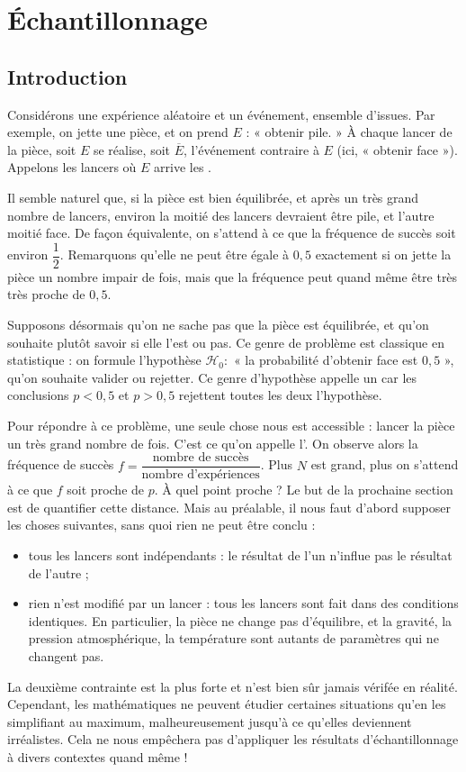 
\chapter{Échantillonnage}

\section{Introduction}

Considérons une expérience aléatoire et un événement, ensemble d'issues.
Par exemple, on jette une pièce, et on prend $E$ : « obtenir pile. »
À chaque lancer de la pièce, soit $E$ se réalise, soit $\overline{E}$, l'événement contraire à $E$ (ici, « obtenir face »).
Appelons les lancers où $E$ arrive les .

Il semble naturel que, si la pièce est bien équilibrée, et après un très grand nombre de lancers, environ la moitié des lancers devraient être pile, et l'autre moitié face.
De façon équivalente, on s'attend à ce que la fréquence de succès soit environ $\dfrac12$.
Remarquons qu'elle ne peut être égale à $0,5$ exactement si on jette la pièce un nombre impair de fois, mais que la fréquence peut quand même être très très proche de $0,5$.

Supposons désormais qu'on ne sache pas que la pièce est équilibrée, et qu'on souhaite plutôt savoir si elle l'est ou pas.
Ce genre de problème est classique en statistique : on formule l'hypothèse $\mathcal{H}_0 :$ « la probabilité d'obtenir face est $0,5$ », qu'on souhaite valider ou rejetter.
Ce genre d'hypothèse appelle un  car les conclusions $p< 0,5$ et $p>0,5$ rejettent toutes les deux l'hypothèse.

Pour répondre à ce problème, une seule chose nous est accessible : lancer la pièce un très grand nombre de fois.
C'est ce qu'on appelle l'.
On observe alors la fréquence de succès $f = \dfrac{\text{nombre de succès}}{\text{nombre d'expériences}}$.
Plus $N$ est grand, plus on s'attend à ce que $f$ soit proche de $p$. À quel point proche ? Le but de la prochaine section est de quantifier cette distance.
Mais au préalable, il nous faut d'abord supposer les choses suivantes, sans quoi rien ne peut être conclu :
	\begin{itemize}
		\item tous les lancers sont indépendants : le résultat de l'un n'influe pas le résultat de l'autre ;
		\item rien n'est modifié par un lancer : tous les lancers sont fait dans des conditions identiques. En particulier, la pièce ne change pas d'équilibre, et la gravité, la pression atmosphérique, la température sont autants de paramètres qui ne changent pas.
	\end{itemize}
La deuxième contrainte est la plus forte et n'est bien sûr jamais vérifée en réalité.
Cependant, les mathématiques ne peuvent étudier certaines situations qu'en les simplifiant au maximum, malheureusement jusqu'à ce qu'elles deviennent irréalistes.
Cela ne nous empêchera pas d'appliquer les résultats d'échantillonnage à divers contextes quand même !

